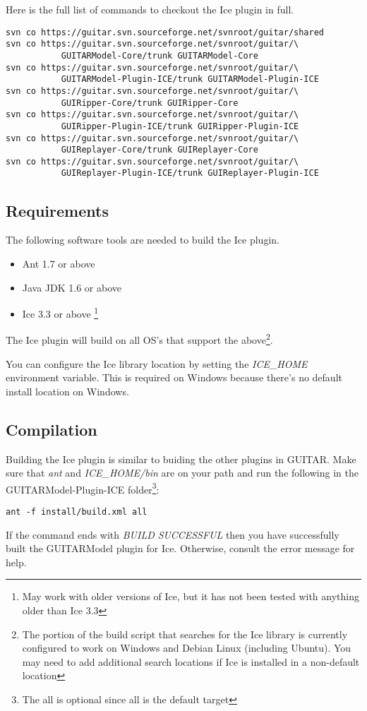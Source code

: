 Here is the full list of commands to checkout the Ice plugin in full.
\begin{verbatim}
svn co https://guitar.svn.sourceforge.net/svnroot/guitar/shared
svn co https://guitar.svn.sourceforge.net/svnroot/guitar/\
           GUITARModel-Core/trunk GUITARModel-Core
svn co https://guitar.svn.sourceforge.net/svnroot/guitar/\
           GUITARModel-Plugin-ICE/trunk GUITARModel-Plugin-ICE
svn co https://guitar.svn.sourceforge.net/svnroot/guitar/\
           GUIRipper-Core/trunk GUIRipper-Core
svn co https://guitar.svn.sourceforge.net/svnroot/guitar/\
           GUIRipper-Plugin-ICE/trunk GUIRipper-Plugin-ICE
svn co https://guitar.svn.sourceforge.net/svnroot/guitar/\
           GUIReplayer-Core/trunk GUIReplayer-Core
svn co https://guitar.svn.sourceforge.net/svnroot/guitar/\
           GUIReplayer-Plugin-ICE/trunk GUIReplayer-Plugin-ICE
\end{verbatim}

\subsection{Requirements}

The following software tools are needed to build the Ice plugin.

\begin{itemize}
\item Ant 1.7 or above
\item Java JDK 1.6 or above
\item Ice 3.3 or above \footnote{May work with older versions of Ice, but it has not been tested with anything older than Ice 3.3}
\end{itemize}

The Ice plugin will build on all OS's that support the above\footnote{The portion of the build script that searches for the Ice library is currently configured to work on Windows and Debian Linux (including Ubuntu). You may need to add additional search locations if Ice is installed in a non-default location}.

You can configure the Ice library location by setting the \emph{ICE\_HOME} environment variable. This is required on Windows because there's no default install location on Windows.

\subsection{Compilation}

Building the Ice plugin is similar to buiding the other plugins in GUITAR. Make sure that \emph{ant} and \emph{ICE\_HOME/bin} are on your path and run the following in the GUITARModel-Plugin-ICE folder\footnote{The all is optional since all is the default target}:

\begin{verbatim}
ant -f install/build.xml all
\end{verbatim}

If the command ends with \emph{BUILD SUCCESSFUL} then you have successfully built the GUITARModel plugin for Ice. Otherwise, consult the error message for help.
